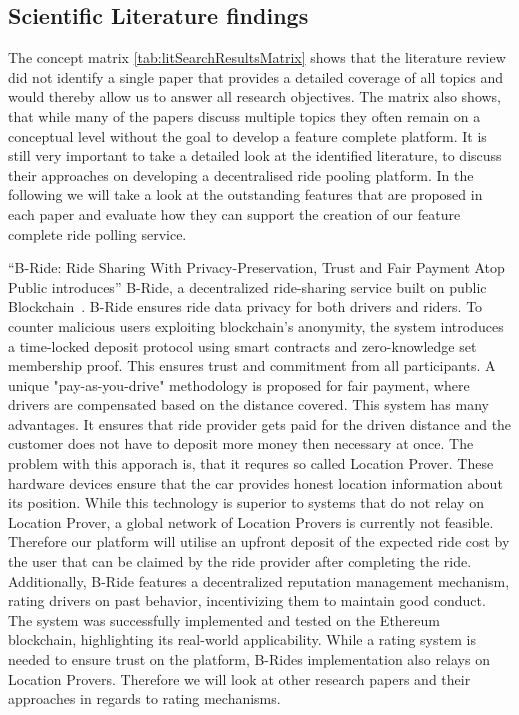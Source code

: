 \subsection{Scientific Literature findings}
The concept matrix \ref{tab:litSearchResultsMatrix} shows that the literature review did not identify a single paper that provides a detailed coverage of all topics and would thereby allow us to answer all research objectives. The matrix also shows, that while many of the papers discuss multiple topics they often remain on a conceptual level without the goal to develop a feature complete platform. It is still very important to take a detailed look at the identified literature, to discuss their approaches on developing a decentralised ride pooling platform. In the following we will take a look at the outstanding features that are proposed in each paper and evaluate how they can support the creation of our feature complete ride polling service.


``B-Ride: Ride Sharing With Privacy-Preservation, Trust and Fair Payment Atop Public
introduces'' B-Ride, a decentralized ride-sharing service built on public Blockchain~\cite{Baza.2021}. B-Ride ensures ride data privacy for both drivers and riders. To counter malicious users exploiting blockchain's anonymity, the system introduces a time-locked deposit protocol using smart contracts and zero-knowledge set membership proof. This ensures trust and commitment from all participants. A unique "pay-as-you-drive" methodology is proposed for fair payment, where drivers are compensated based on the distance covered. This 
system has many advantages. It ensures that ride provider gets paid for the driven distance and the customer does not have to deposit more money then necessary at once. The problem with this apporach is, that it requres so called Location Prover. These hardware devices ensure that the car provides honest location information about its position. While this technology is superior to systems that do not relay on Location Prover, a global network of Location Provers is currently not feasible. Therefore our platform will utilise an upfront deposit of the expected ride cost by the user that can be claimed by the ride provider after completing the ride.
Additionally, B-Ride features a decentralized reputation management mechanism, rating drivers on past behavior, incentivizing them to maintain good conduct. The system was successfully implemented and tested on the Ethereum blockchain, highlighting its real-world applicability. While a rating system is needed to ensure trust on the platform, B-Rides implementation also relays on Location Provers. Therefore we will look at other research papers and their approaches in regards to rating mechanisms.

